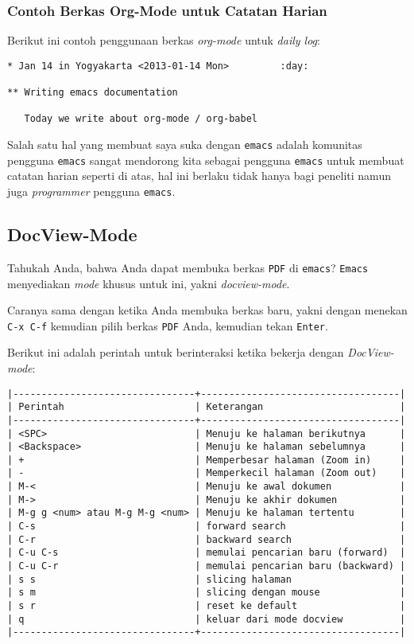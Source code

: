 \documentclass{article}
\begin{document}
\subsubsection{Contoh Berkas Org-Mode untuk Catatan Harian}
Berikut ini contoh penggunaan berkas \emph{org-mode} untuk \emph{daily log}:

\begin{verbatim}
* Jan 14 in Yogyakarta <2013-01-14 Mon>			:day:

** Writing emacs documentation

   Today we write about org-mode / org-babel
\end{verbatim}

Salah satu hal yang membuat saya suka dengan \verb=emacs= adalah komunitas
pengguna \verb=emacs= sangat mendorong kita sebagai pengguna \verb=emacs=
untuk membuat catatan harian seperti di atas, hal ini berlaku tidak hanya
bagi peneliti namun juga \emph{programmer} pengguna \verb=emacs=.

\subsection{DocView-Mode}
Tahukah Anda, bahwa Anda dapat membuka berkas \verb=PDF= di \verb=emacs=?
\verb=Emacs= menyediakan \emph{mode} khusus untuk ini, yakni 
\emph{docview-mode}.

Caranya sama dengan ketika Anda membuka berkas baru, yakni dengan menekan
\verb=C-x C-f= kemudian pilih berkas \verb=PDF= Anda, kemudian tekan 
\verb=Enter=.

Berikut ini adalah perintah untuk berinteraksi ketika bekerja dengan 
\emph{DocView-mode}:

\begin{verbatim}
|--------------------------------+-----------------------------------|
| Perintah                       | Keterangan                        |
|--------------------------------+-----------------------------------|
| <SPC>                          | Menuju ke halaman berikutnya      |
| <Backspace>                    | Menuju ke halaman sebelumnya      |
| +                              | Memperbesar halaman (Zoom in)     |
| -                              | Memperkecil halaman (Zoom out)    |
| M-<                            | Menuju ke awal dokumen            |
| M->                            | Menuju ke akhir dokumen           |
| M-g g <num> atau M-g M-g <num> | Menuju ke halaman tertentu        |
| C-s                            | forward search                    |
| C-r                            | backward search                   |
| C-u C-s                        | memulai pencarian baru (forward)  |
| C-u C-r                        | memulai pencarian baru (backward) |
| s s                            | slicing halaman                   |
| s m                            | slicing dengan mouse              |
| s r                            | reset ke default                  |
| q                              | keluar dari mode docview          |
|--------------------------------+-----------------------------------|
\end{verbatim}
\end{document}

